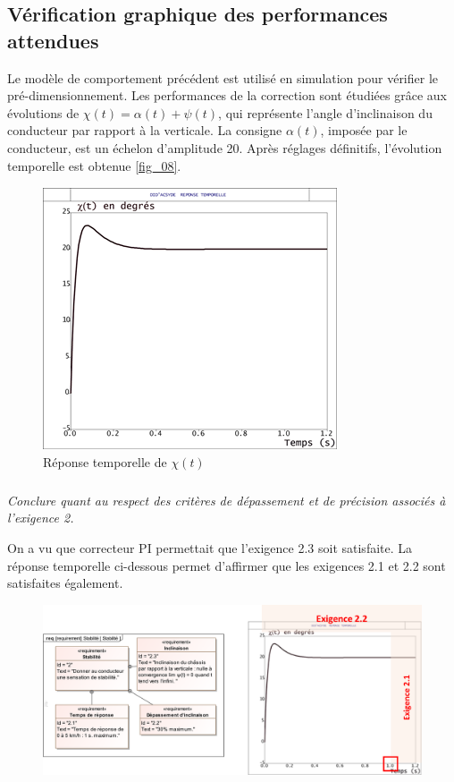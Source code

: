 \documentclass[10pt,fleqn]{article} %
\begin{document}
\subsection{Vérification graphique des performances attendues}
\ifprof
\else
Le modèle de comportement précédent est utilisé en simulation pour vérifier le pré-dimensionnement. Les performances de la correction sont étudiées grâce aux évolutions de $\chi(t)=\alpha(t)+\psi(t)$, qui représente l’angle d’inclinaison du conducteur par rapport à la verticale. La consigne $\alpha(t)$, imposée par le conducteur, est un échelon d’amplitude 20\degres. Après réglages définitifs, l’évolution temporelle est obtenue \autoref{fig_08}. 
\fi

\ifprof
\else
\begin{figure}[H]
\centering
\includegraphics[width=0.6\linewidth]{fig_08}
\caption{Réponse temporelle de $\chi(t)$ \label{fig_08}}
\end{figure}
\fi

\subparagraph{\label{q_34}}\textit{Conclure quant au respect des critères de dépassement et de précision associés à l'exigence 2.}
\ifprof
\begin{corrige}

On a vu que correcteur PI permettait que l'exigence 2.3 soit satisfaite. La réponse temporelle ci-dessous permet d'affirmer que les exigences 2.1 et 2.2 sont satisfaites également.


\begin{figure}[H]
\centering
\includegraphics[width=0.7\linewidth]{cor_14}
\end{figure}

\end{corrige}
\else
\fi
\end{document}
